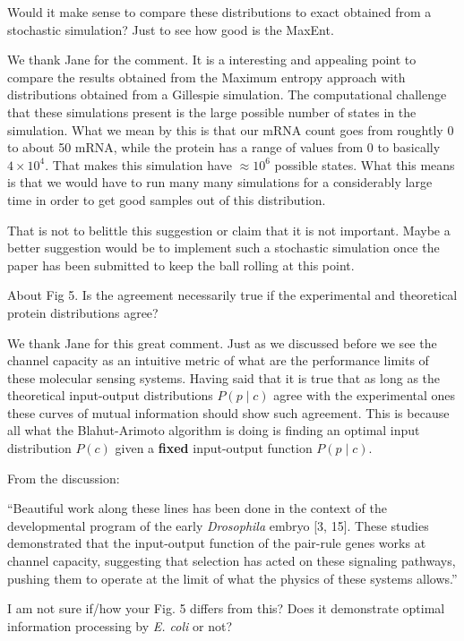 \begin{tcolorbox}
Would it make sense to compare these distributions to exact obtained from a
stochastic simulation? Just to see how good is the MaxEnt.
\end{tcolorbox}

We thank Jane for the comment. It is a interesting and appealing point to
compare the results obtained from the Maximum entropy approach with
distributions obtained from a Gillespie simulation. The computational challenge
that these simulations present is the large possible number of states in the
simulation. What we mean by this is that our mRNA count goes from roughtly 0 to
about 50 mRNA, while the protein has a range of values from 0 to basically
$4 \times 10^4$. That makes this simulation have $\approx 10^6$ possible states.
What this means is that we would have to run many many simulations for a
considerably large time in order to get good samples out of this distribution.

That is not to belittle this suggestion or claim that it is not important. Maybe
a better suggestion would be to implement such a stochastic simulation once the
paper has been submitted to keep the ball rolling at this point.

\begin{tcolorbox}
  About Fig 5. Is the agreement necessarily true if the experimental and
  theoretical protein distributions agree?
\end{tcolorbox}

We thank Jane for this great comment. Just as we discussed before we see the
channel capacity as an intuitive metric of what are the performance limits of
these molecular sensing systems. Having said that it is true that as long as the
theoretical input-output distributions $P(p \mid c)$ agree with the experimental
ones these curves of mutual information should show such agreement. This is
because all what the Blahut-Arimoto algorithm is doing is finding an optimal
input distribution $P(c)$ given a \textbf{fixed} input-output function
$P(p \mid c)$.

\begin{tcolorbox}
From the discussion:

``Beautiful work along these lines has been done in the context of the
developmental program of the early \textit{Drosophila} embryo [3, 15]. These
studies demonstrated that the input-output function of the pair-rule genes works
at channel capacity, suggesting that selection has acted on these signaling
pathways, pushing them to operate at the limit of what the physics of these
systems allows.''

I am not sure if/how your Fig. 5 differs from this? Does it demonstrate optimal
information processing by \textit{E. coli} or not?
\end{tcolorbox}

